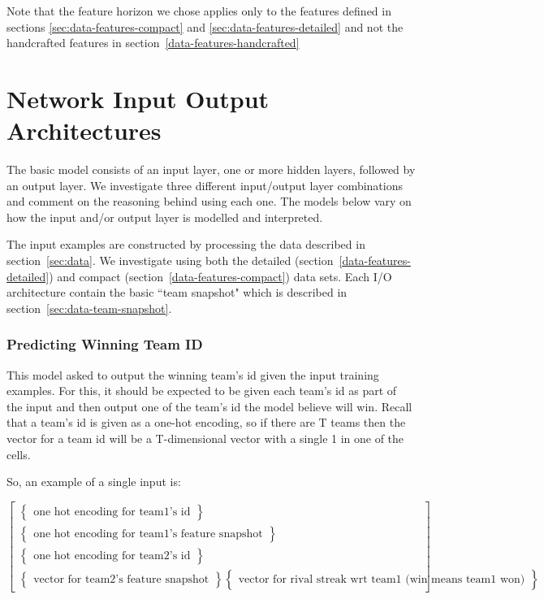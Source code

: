 \documentclass{article} %
\begin{document}
\begin{enumerate}
Note that the feature horizon we chose applies only to the features defined in sections \ref{sec:data-features-compact} and \ref{sec:data-features-detailed} and not the handcrafted features in section~\ref{data-features-handcrafted}


\section{Network Input Output Architectures}
\label{sec:io-architectures}

The basic model consists of an input layer, one or more hidden layers, followed by an output layer.  We investigate three different input/output layer combinations and comment on the reasoning behind using each one.  The models below vary on how the input and/or output layer is modelled and interpreted.


The input examples are constructed by processing the data described in section~\ref{sec:data}.  We investigate using both the detailed (section~\ref{data-features-detailed}) and compact (section~\ref{data-features-compact}) data sets.  Each I/O architecture contain the basic ``team snapshot" which is described in section~\ref{sec:data-team-snapshot}.

\subsubsection{Predicting Winning Team ID}
\label{sec:io-architectures-winning-team-id}

This model asked to output the winning team's id given the input training examples.  For this, it should be expected to be given each team's id as part of the input and then output one of the team's id the model believe will win.  Recall that a team's id is given as a one-hot encoding, so if there are T teams then the vector for a team id will be a T-dimensional vector with a single 1 in one of the cells.

So, an example of a single input is:

\[
\begin{bmatrix}
  \begin{Bmatrix}
    \text{one hot encoding for team1's id}
  \end{Bmatrix}
  \\
  \begin{Bmatrix}
    \text{one hot encoding for team1's feature snapshot}
  \end{Bmatrix}
  \\
  \begin{Bmatrix}
    \text{one hot encoding for team2's id}
  \end{Bmatrix}
  \\
  \begin{Bmatrix}
    \text{vector for team2's feature snapshot}
  \end{Bmatrix}
  \begin{Bmatrix}
    \text{vector for rival streak wrt team1 (win means team1 won)}
  \end{Bmatrix}
\end{bmatrix}
\]


\end{enumerate}
\end{document}
